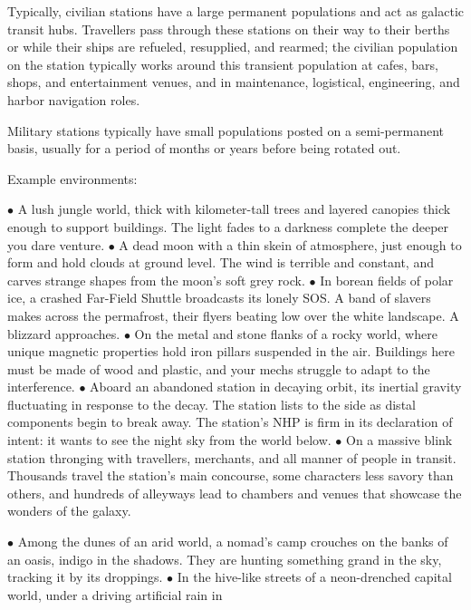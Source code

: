 Typically, civilian stations have a large permanent populations and act as galactic transit hubs.  
Travellers pass through these stations on their way to their berths or while their ships are  
refueled, resupplied, and rearmed; the civilian population on the station typically works around  
this transient population at cafes, bars, shops, and entertainment venues, and in maintenance,  
logistical, engineering, and harbor navigation roles. 
 

Military stations typically have small populations posted on a semi-permanent basis, usually for a  
period of months or years before being rotated out.   
 

Example environments:  
 

    $\bullet$    A lush jungle world, thick with kilometer-tall trees and layered canopies thick enough to  
        support buildings. The light fades to a darkness complete the deeper you dare venture.  
    $\bullet$    A dead moon with a thin skein of atmosphere, just enough to form and hold clouds at  
        ground level. The wind is terrible and constant, and carves strange shapes from the  
        moon’s soft grey rock.    
    $\bullet$    In borean fields of polar ice, a crashed Far-Field Shuttle broadcasts its lonely SOS. A band  
        of slavers makes across the permafrost, their flyers beating low over the white landscape.  
        A blizzard approaches.        
    $\bullet$    On the metal and stone flanks of a rocky world, where unique magnetic properties hold  
        iron pillars suspended in the air. Buildings here must be made of wood and plastic, and  
        your mechs struggle to adapt to the interference.    
    $\bullet$    Aboard an abandoned station in decaying orbit, its inertial gravity fluctuating in response  
        to the decay. The station lists to the side as distal components begin to break away. The  
        station’s NHP is firm in its declaration of intent: it wants to see the night sky from the  
        world below.     
    $\bullet$    On a massive blink station thronging with travellers, merchants, and all manner of people  
        in transit. Thousands travel the station’s main concourse, some characters less savory  
        than others, and hundreds of alleyways lead to chambers and venues that showcase the  
        wonders of the galaxy.   

                                                                                                         


$\bullet$    Among the dunes of an arid world, a nomad’s camp crouches on the banks of an oasis,  
    indigo in the shadows. They are hunting something grand in the sky, tracking it by its  
    droppings.   
$\bullet$    In the hive-like streets of a neon-drenched capital world, under a driving artificial rain in  

